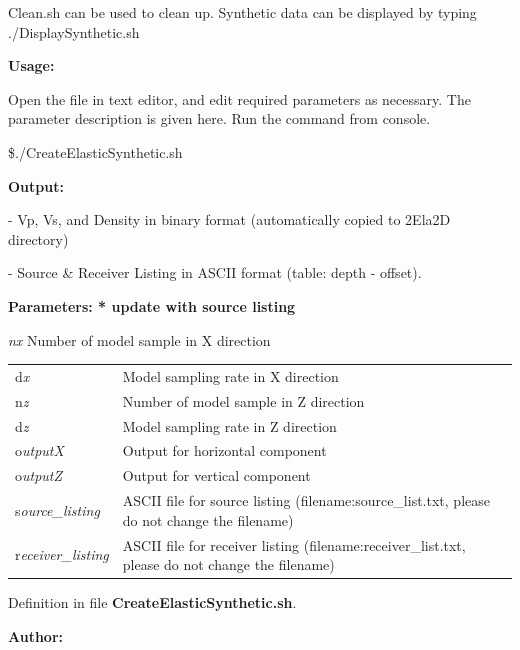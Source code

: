 \documentclass{article}
\begin{document}
\vspace{1pt}
Clean.sh can be used to clean up. Synthetic data can be displayed by typing ./DisplaySynthetic.sh

\vspace{4pt}
\textbf{Usage:}

\vspace{4pt}
Open the file in text editor, and edit required parameters as necessary. The parameter 
description is given here. Run the command from console. 

\vspace{16pt}
\$./CreateElasticSynthetic.sh 

\vspace{4pt}
\textbf{Output:}

\vspace{4pt}
- Vp, Vs, and Density in binary format (automatically copied to 2Ela2D directory)

\vspace{4pt}
- Source \& Receiver Listing in ASCII format (table: depth - offset). 

\vspace{4pt}
\textbf{Parameters: * update with source listing}

\vspace{4pt}
\textit{nx} Number of model sample in X direction 

\vspace{4pt}
\begin{tabular}{|>{\raggedright}p{54pt}|>{\raggedright}p{245pt}|}
\hline
\tabularnewline
\hline
d\textit{x}  & Model sampling rate in X direction \tabularnewline
\hline
n\textit{z}  & Number of model sample in Z direction \tabularnewline
\hline
d\textit{z}  & Model sampling rate in Z direction \tabularnewline
\hline
o\textit{utputX}  & Output for horizontal component \tabularnewline
\hline
o\textit{utputZ}  & Output for vertical component \tabularnewline
\hline
s\textit{ource\_listing}  & ASCII file for source listing (filename:source\_list.txt, 
please do not change the filename) \tabularnewline
\hline
r\textit{eceiver\_listing}  & ASCII file for receiver listing (filename:receiver\_list.txt, 
please do not change the filename) \tabularnewline
\hline
\end{tabular}

\vspace{13pt}
Definition in file \textbf{CreateElasticSynthetic.sh}.

\vspace{4pt}
\textbf{Author:}
\end{document}

